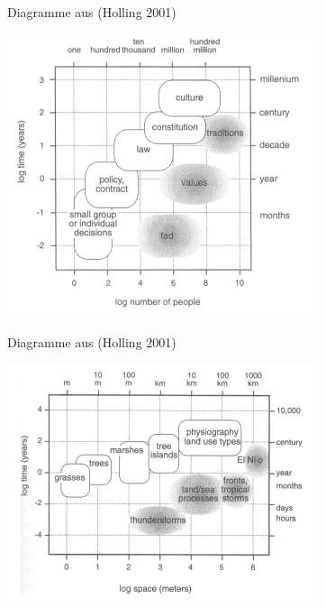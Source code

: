 \documentclass{beamer}
\begin{document}
\begin{frame}{Diagramme aus (Holling 2001)}
  \begin{center}
    \includegraphics[width=.75\textwidth]{Holling-2.png}
  \end{center}
\end{frame}

\begin{frame}{Diagramme aus (Holling 2001)}
  \begin{center}
    \includegraphics[width=.85\textwidth]{Holling-3.png}
  \end{center}
\end{frame}
\end{document}
